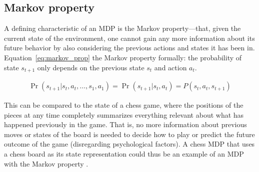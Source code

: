 \subsection{Markov property}

A defining characteristic of an MDP is the Markov property---that, given the
current state of the environment, one cannot gain any more information about
its future behavior by also considering the previous actions and states it has
been in. Equation~\eqref{eq:markov_prop} the Markov property formally: the probability
of state $s_{t+1}$ only depends on the previous state $s_t$ and action $a_t$.

\begin{align}
\label{eq:markov_prop}
\Pr(s_{t+1} | s_t, a_t, \ldots, s_1, a_1) 
  = \Pr(s_{t+1} | s_t, a_t) 
  = P(s_t, a_t, s_{t+1})
\end{align}

This can be compared to the state of a chess game, where the positions
of the pieces at any time completely summarizes everything relevant about what
has happened previously in the game. That is, no more information about
previous moves or states of the board is needed to decide how to play or
predict the future outcome of the game (disregarding psychological factors). A
chess MDP that uses a chess board as its state representation could thus be an
example of an MDP with the Markov property \parencite{altman2002applications}. 
